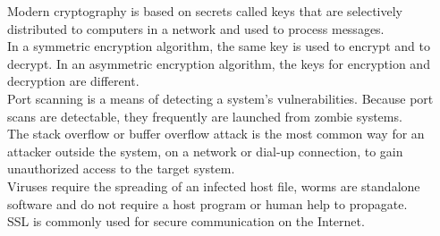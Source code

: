 \documentclass[12pt]{article}
\begin{document}
Modern cryptography is based on secrets called keys that are selectively distributed to computers in a network and used to process messages.\\[2mm]
In a symmetric encryption algorithm, the same key is used to encrypt and to decrypt. In an asymmetric encryption algorithm, the keys for encryption and decryption are different.\\[2mm]
Port scanning is a means of detecting a system’s vulnerabilities. Because port scans are detectable, they frequently are launched from zombie systems.\\[2mm]
The stack overflow or buffer overflow attack is the most common way for an attacker outside the system, on a network or dial-up connection, to gain unauthorized access to the target system.\\[2mm]
Viruses require the spreading of an infected host file, worms are standalone software and do not require a host program or human help to propagate.\\[2mm]
SSL is commonly used for secure communication on the Internet.
\newpage
\end{document}
